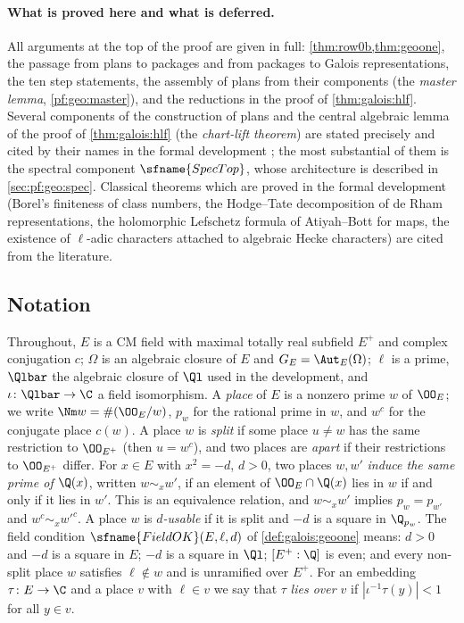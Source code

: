 \paragraph{What is proved here and what is deferred.}
All arguments at the top of the proof are given in full: \cref{thm:row0b,thm:geoone}, the
passage from plans to packages and from packages to Galois representations, the ten step
statements, the assembly of plans from their components (the \emph{master lemma},
\cref{pf:geo:master}), and the reductions in the proof of \cref{thm:galois:hlf}. Several components
of the construction of plans and the central algebraic lemma of the proof of
\cref{thm:galois:hlf} (the \emph{chart-lift theorem}) are stated precisely and cited by their names in
the formal development \cite{LeanSource2026}; the most substantial of them is the spectral
component $\sfname{SpecTop}$, whose architecture is described in \cref{sec:pf:geo:spec}. Classical
theorems which are proved in the formal development (Borel's finiteness of class numbers, the
Hodge--Tate decomposition of de Rham representations, the holomorphic Lefschetz formula of
Atiyah--Bott for maps, the existence of $\ell$-adic characters attached to algebraic Hecke
characters) are cited from the literature.

\subsection{Notation}\label{sec:pf:geo:conv}

Throughout, $E$ is a CM field with maximal totally real subfield $E^+$ and complex conjugation
$c$; $\Omega$ is an algebraic closure of $E$ and $G_E=\Aut_E(\Omega)$; $\ell$ is a prime, $\Qlbar$ the
algebraic closure of $\Ql$ used in the development, and $\iota\colon\Qlbar\to\C$ a field isomorphism.
A \emph{place} of $E$ is a nonzero prime $w$ of $\OO_E$; we write $\Nm w=\#(\OO_E/w)$, $p_w$ for the
rational prime in $w$, and $w^c$ for the conjugate place $c(w)$. A place $w$ is \emph{split} if
some place $u\ne w$ has the same restriction to $\OO_{E^+}$ (then $u=w^c$), and two places are
\emph{apart} if their restrictions to $\OO_{E^+}$ differ. For $x\in E$ with $x^2=-d$, $d>0$, two
places $w,w'$ \emph{induce the same prime of $\Q(x)$}, written $w\sim_xw'$, if an element of
$\OO_E\cap\Q(x)$ lies in $w$ if and only if it lies in $w'$. This is an equivalence relation, and
$w\sim_xw'$ implies $p_w=p_{w'}$ and $w^c\sim_xw'^c$. A place $w$ is \emph{$d$-usable} if it is split
and $-d$ is a square in $\Q_{p_w}$. The field condition $\sfname{FieldOK}(E,\ell,d)$ of
\cref{def:galois:geoone} means: $d>0$ and $-d$ is a square in $E$; $-d$ is a square in $\Ql$;
$[E^+:\Q]$ is even; and every non-split place $w$ satisfies $\ell\notin w$ and is unramified over
$E^+$. For an embedding $\tau\colon E\to\C$ and a place $v$ with $\ell\in v$ we say that $\tau$
\emph{lies over $v$} if $|\iota^{-1}\tau(y)|<1$ for all $y\in v$.

